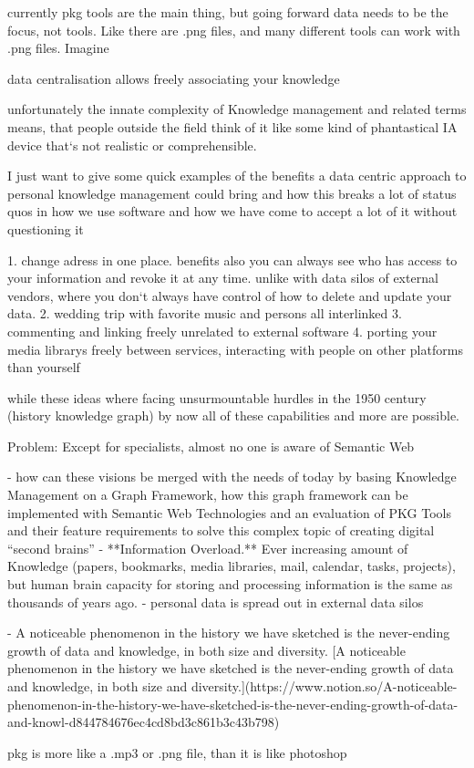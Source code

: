currently pkg tools are the main thing, but going forward data needs to be the focus, not tools. Like there are .png files, and many different tools can work with .png files. Imagine 

data centralisation allows freely associating your knowledge

unfortunately the innate complexity of Knowledge management and related terms means, that people outside the field think of it like some kind of phantastical IA device that‘s not realistic or comprehensible.

I just want to give some quick examples of the benefits a data centric approach to personal knowledge management could bring and how this breaks a lot of status quos in how we use software and how we have come to accept a lot of it without questioning it

1. change adress in one place. benefits also you can always see who has access to your information and revoke it at any time. unlike with data silos of external vendors, where you don‘t always have control of how to delete and update your data.
2. wedding trip with favorite music and persons all interlinked 
3. commenting and linking freely unrelated to external software
4. porting your media librarys freely between services, interacting with people on other platforms than yourself

while these ideas where facing unsurmountable hurdles in the 1950 century (history knowledge graph) by now all of these capabilities and more are possible.

Problem: Except for specialists, almost no one is aware of Semantic Web

- how can these visions be merged with the needs of today by basing Knowledge Management on a Graph Framework, how this graph framework can be implemented with Semantic Web Technologies and an evaluation of PKG Tools and their feature requirements to solve this complex topic of creating digital “second brains”
- **Information Overload.** Ever increasing amount of Knowledge (papers, bookmarks, media libraries, mail, calendar, tasks, projects), but human brain capacity for storing and processing information is the same as thousands of years ago.
- personal data is spread out in external data silos

- A noticeable phenomenon in the history we have sketched is the never-ending growth of data and knowledge, in both size and diversity. [A noticeable phenomenon in the history we have sketched is the never-ending growth of data and knowledge, in both size and diversity.](https://www.notion.so/A-noticeable-phenomenon-in-the-history-we-have-sketched-is-the-never-ending-growth-of-data-and-knowl-d844784676ec4cd8bd3c861b3c43b798)

pkg is more like a .mp3 or .png file, than it is like photoshop